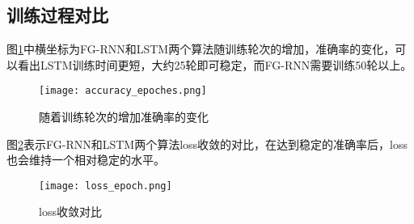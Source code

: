 


\subsection{训练过程对比}
图\ref{fig:随着训练轮次的增加准确率的变化}中横坐标为FG-RNN和LSTM两个算法随训练轮次的增加，准确率的变化，可以看出LSTM训练时间更短，大约25轮即可稳定，而FG-RNN需要训练50轮以上。

\begin{figure}[H]
    \centering
    \texttt{[image: accuracy\_epoches.png]}
    \caption{随着训练轮次的增加准确率的变化}
    \label{fig:随着训练轮次的增加准确率的变化}
  \end{figure}

图\ref{fig:loss收敛对比}表示FG-RNN和LSTM两个算法loss收敛的对比，在达到稳定的准确率后，loss也会维持一个相对稳定的水平。
  \begin{figure}[H]
    \centering
    \texttt{[image: loss\_epoch.png]}
    \caption{loss收敛对比}
    \label{fig:loss收敛对比}
  \end{figure}

